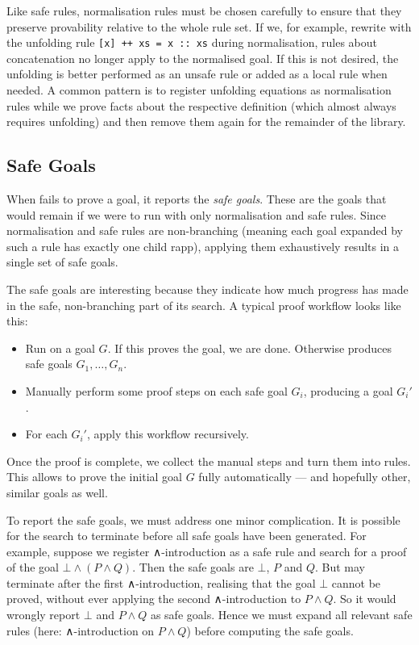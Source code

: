Like safe rules, normalisation rules must be chosen carefully to ensure that they preserve provability relative to the whole rule set.
If we, for example, rewrite with the unfolding rule \texttt{[x] ++ xs = x :: xs} during normalisation, rules about concatenation no longer apply to the normalised goal.
If this is not desired, the unfolding is better performed as an unsafe rule or added as a local rule when needed.
A common pattern is to register unfolding equations as normalisation rules while we prove facts about the respective definition (which almost always requires unfolding) and then remove them again for the remainder of the library.


\subsection{Safe Goals}%
\label{sec:safe-prefix}

When \Aesop{} fails to prove a goal, it reports the \emph{safe goals}.
These are the goals that would remain if we were to run \Aesop{} with only normalisation and safe rules.
Since normalisation and safe rules are non-branching (meaning each goal expanded by such a rule has exactly one child rapp), applying them exhaustively results in a single set of safe goals.

The safe goals are interesting because they indicate how much progress \Aesop{} has made in the safe, non-branching part of its search.
A typical \Aesop{} proof workflow looks like this:
\begin{itemize}
  \item
    Run \Aesop{} on a goal $G$.
    If this proves the goal, we are done.
    Otherwise \Aesop{} produces safe goals $G_{1}, \dots, G_{n}$.
  \item
    Manually perform some proof steps on each safe goal $G_{i}$, producing a goal $G_{i}'$.
  \item
    For each $G_{i}'$, apply this workflow recursively.
\end{itemize}
Once the proof is complete, we collect the manual steps and turn them into \Aesop{} rules.
This allows \Aesop{} to prove the initial goal $G$ fully automatically --- and hopefully other, similar goals as well.

To report the safe goals, we must address one minor complication.
It is possible for the search to terminate before all safe goals have been generated.
For example, suppose we register ∧-introduction as a safe rule and search for a proof of the goal $⊥ ∧ (P ∧ Q)$.
Then the safe goals are $⊥$, $P$ and $Q$.
But \Aesop{} may terminate after the first ∧-introduction, realising that the goal $⊥$ cannot be proved, without ever applying the second ∧-introduction to $P ∧ Q$.
So it would wrongly report $⊥$ and $P ∧ Q$ as safe goals.
Hence we must expand all relevant safe rules (here: ∧-introduction on $P ∧ Q$) before computing the safe goals.


